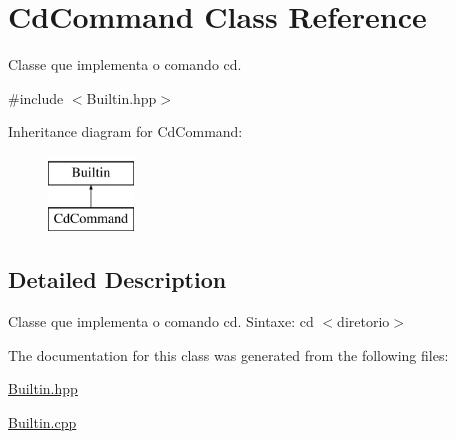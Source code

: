 \hypertarget{classCdCommand}{
\section{CdCommand Class Reference}
\label{classCdCommand}
}


Classe que implementa o comando cd.  




{\ttfamily \#include $<$Builtin.hpp$>$}

Inheritance diagram for CdCommand:\begin{figure}[H]
\begin{center}
\leavevmode
\includegraphics[height=2.000000cm]{classCdCommand}
\end{center}
\end{figure}


\subsection{Detailed Description}
Classe que implementa o comando cd. Sintaxe: cd $<$diretorio$>$ 

The documentation for this class was generated from the following files:\begin{DoxyCompactItemize}
\item 
\hyperlink{Builtin_8hpp}{Builtin.hpp}\item 
\hyperlink{Builtin_8cpp}{Builtin.cpp}\end{DoxyCompactItemize}
